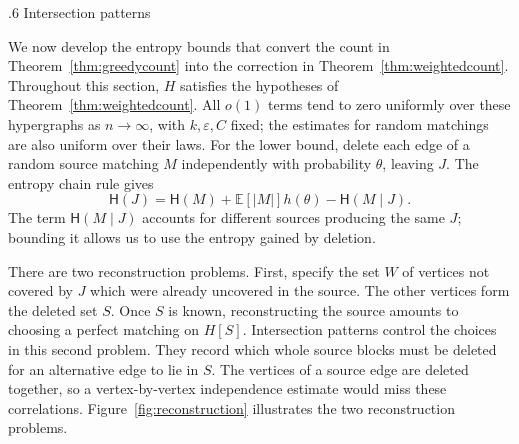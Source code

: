 \documentclass[11pt,reqno]{amsart}
\makeatletter
\numberwithin{equation}{section}
\renewcommand{\section}{\@startsection{section}{1}%
    \z@{1.3\linespacing\@plus.5\linespacing\@minus.2\linespacing}%
    {.6\linespacing}%
    {\normalfont\scshape\centering}}
\theoremstyle{plain}
\theoremstyle{definition}
\newcommand{\E}{\mathbb E}
\newcommand{\HH}{\mathsf H}
\newcommand{\eps}{\varepsilon}
\makeatother
\begin{document}

\section{Intersection patterns}\label{sec:patterns}

We now develop the entropy bounds that convert the count in Theorem~\ref{thm:greedycount} into the correction in Theorem~\ref{thm:weightedcount}.
Throughout this section, $H$ satisfies the hypotheses of Theorem~\ref{thm:weightedcount}.
All $o(1)$ terms tend to zero uniformly over these hypergraphs as $n\to\infty$, with $k,\eps,C$ fixed; the estimates for random matchings are also uniform over their laws.
For the lower bound, delete each edge of a random source matching $M$ independently with probability $\theta$, leaving $J$.
The entropy chain rule gives
\[
    \HH(J)=\HH(M)+\E[|M|]h(\theta)-\HH(M\mid J).
\]
The term $\HH(M\mid J)$ accounts for different sources producing the same $J$; bounding it allows us to use the entropy gained by deletion.

There are two reconstruction problems.
First, specify the set $W$ of vertices not covered by $J$ which were already uncovered in the source.
The other vertices form the deleted set $S$.
Once $S$ is known, reconstructing the source amounts to choosing a perfect matching on $H[S]$.
Intersection patterns control the choices in this second problem.
They record which whole source blocks must be deleted for an alternative edge to lie in $S$.
The vertices of a source edge are deleted together, so a vertex-by-vertex independence estimate would miss these correlations.
Figure~\ref{fig:reconstruction} illustrates the two reconstruction problems.
\end{document}
